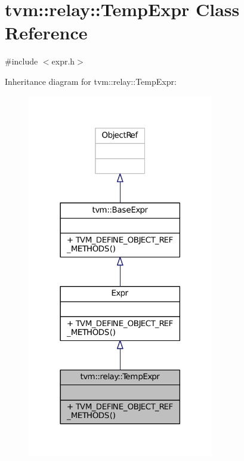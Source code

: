 \hypertarget{classtvm_1_1relay_1_1TempExpr}{}\section{tvm\+:\+:relay\+:\+:Temp\+Expr Class Reference}
\label{classtvm_1_1relay_1_1TempExpr}


{\ttfamily \#include $<$expr.\+h$>$}



Inheritance diagram for tvm\+:\+:relay\+:\+:Temp\+Expr\+:
\nopagebreak
\begin{figure}[H]
\begin{center}
\leavevmode
\includegraphics[width=230pt]{classtvm_1_1relay_1_1TempExpr__inherit__graph}
\end{center}
\end{figure}


